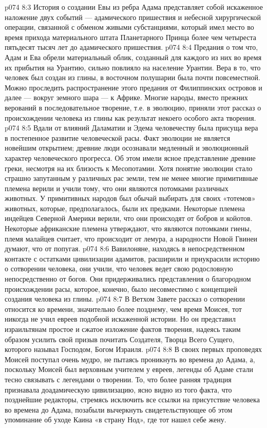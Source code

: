 \vs p074 8:3 История о создании Евы из ребра Адама представляет собой искаженное наложение двух событий --- адамического пришествия и небесной хирургической операции, связанной с обменом живыми субстанциями, который имел место во время прихода материального штата Планетарного Принца более чем четыреста пятьдесят тысяч лет до адамического пришествия.
\vs p074 8:4 \pc Предания о том что, Адам и Ева обрели материальный облик, созданный для каждого из них во время их прибытия на Урантию, сильно повлияло на население Урантии. Вера в то, что человек был создан из глины, в восточном полушарии была почти повсеместной. Можно проследить распространение этого предания от Филиппинских островов и далее --- вокруг земного шара --- к Африке. Многие народы, вместо прежних верований в последовательное творение, т.е. в эволюцию, приняли этот рассказ о происхождении человека из глины как результат некоего особого акта творения.
\vs p074 8:5 Вдали от влияний Даламатии и Эдема человечеству была присуща вера в постепенное развитие человеческой расы. Факт эволюции не является новейшим открытием; древние люди осознавали медленный и эволюционный характер человеческого прогресса. Об этом имели ясное представление древние греки, несмотря на их близость к Месопотамии. Хотя понятие эволюции стало страшно запутанным у различных рас земли, тем не менее многие примитивные племена верили и учили тому, что они являются потомками различных животных. У примитивных народов был обычай выбирать для своих «тотемов» животных, которые, предполагалось, были их предками. Некоторые племена индейцев Северной Америки верили, что они происходят от бобров и койотов. Некоторые африканские племена утверждают, что являются потомками гиены, племя малайцев считает, что происходит от лемура, а народности Новой Гвинеи думают, что от попугая.
\vs p074 8:6 Вавилоняне, находясь в непосредственном контакте с остатками цивилизации адамитов, расширили и приукрасили историю о сотворении человека, они учили, что человек ведет свою родословную непосредственно от богов. Они придерживались представления о благородном происхождении расы, которое, конечно, было несовместимо с концепцией создания человека из глины.
\vs p074 8:7 \pc В Ветхом Завете рассказ о сотворении относится ко времени, значительно более позднему, чем время Моисея, тот никогда не учил евреев подобной искаженной истории. Но он представил израильтянам простое и сжатое изложение фактов творения, надеясь таким образом усилить свой призыв почитать Создателя, Творца Всего Сущего, которого называл Господом, Богом Израиля.
\vs p074 8:8 В своих первых проповедях Моисей поступал очень мудро, не пытаясь проникнуть во времена до Адама, а, поскольку Моисей был верховным учителем у евреев, легенды об Адаме стали тесно связывать с легендами о творении. То, что более ранняя традиция признавала доадамическую цивилизацию, ясно видно из того факта, что позднейшие редакторы, стремясь исключить все ссылки на присутствие человека во времена до Адама, позабыли вычеркнуть свидетельствующее об этом упоминание об уходе Каина «в страну Нод», где тот нашел себе жену.
